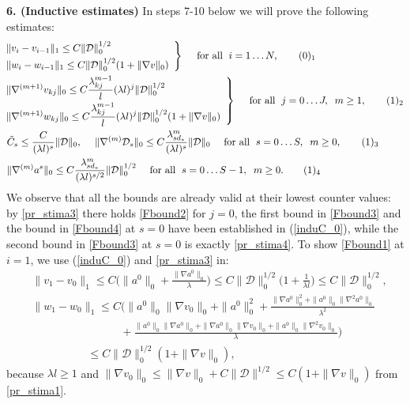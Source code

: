 \documentclass[reqno,twoside,11pt]{amsart}
\numberwithin{equation}{section}
\theoremstyle{plain}
\theoremstyle{definition}
\begin{document}
{\bf 6. (Inductive estimates)} In steps 7-10 below we will prove the following estimates:
\begin{align*}
& \hspace{-3mm} \left. \begin{array}{l} \|v_i - v_{i-1}\|_1\leq
    C\|\mathcal{D}\|_0^{1/2} \vspace{1mm} \\ \|w_i -
w_{i-1}\|_1\leq C\|\mathcal{D}\|_0^{1/2}(1+\|\nabla v\|_0) \end{array}\right\}\quad\mbox{
  for all }\; i=1\ldots N, \tag*{(\theequation)$_1$}\refstepcounter{equation} \label{Fbound1}\medskip\\
& \hspace{-3mm} \left. \begin{array}{l}
\displaystyle{ \|\nabla^{(m+1)}v_{kj}\|_0\leq C\frac{\lambda_{kj}^{m-1}}{l} (\lambda l)^j\|\mathcal{D}\|_0^{1/2} }
\vspace{1mm} \\  \displaystyle{\|\nabla^{(m+1)}w_{kj}\|_0\leq C\frac{\lambda_{kj}^{m-1}}{l} (\lambda
l)^j\|\mathcal{D}\|_0^{1/2} (1+\|\nabla v\|_0)}
\end{array}\right\} \quad\mbox{ for all }\; j=0\ldots J, \; \; m\geq
1, \tag*{(\theequation)$_2$}\label{Fbound2} \medskip\\
& \tilde C_s\leq \frac{C}{(\lambda l)^s}\|\mathcal{D}\|_0, \; \quad
\|\nabla^{(m)}\mathcal{D}_s\|_0\leq C\frac{\lambda_{sd_*}^m}{(\lambda
  l)^s}\|\mathcal{D}\|_0 \quad\mbox{ for all }\; s=0\ldots S, \;\;
m\geq 0, \tag*{(\theequation)$_3$}\label{Fbound3} \medskip\\
& \|\nabla^{(m)}a^s\|_0\leq C\frac{\lambda_{sd_*}^m}{(\lambda
  l)^{s/2}}\|\mathcal{D}\|_0^{1/2} \quad\mbox{ for all }\; s=0\ldots
S-1, \;\; m\geq 0. \tag*{(\theequation)$_4$}\label{Fbound4} 
\end{align*}
We observe that all the bounds are already valid at their lowest counter values:
by \ref{pr_stima3} there holds \ref{Fbound2} for $j=0$,
the first bound in \ref{Fbound3} and the bound in \ref{Fbound4} at
$s=0$ have been established in (\ref{induC_0}), while the second bound
in \ref{Fbound3} at $s=0$ is exactly \ref{pr_stima4}. To show
\ref{Fbound1} at $i=1$, we use (\ref{induC_0}) and \ref{pr_stima3} in:
\begin{equation*}
\begin{split}
& \|v_1-v_0\|_1\leq C\Big(\|a^0\|_0 +
\frac{\|\nabla a^0\|_0}{\lambda}\Big) \leq C\|\mathcal{D}\|^{1/2}_0
\big(1+\frac{1}{\lambda l}\big)\leq C\|\mathcal{D}\|^{1/2}_0,\\
& \|w_1-w_0\|_1\leq C\Big(\|a^0\|_0 \|\nabla v_0\|_0 + \|a^0\|_0^2 + 
\frac{\|\nabla a^0\|_0^2+ \|a^0\|_0 \|\nabla^2 a^0\|_0}{\lambda^2} \\
& \qquad\qquad \qquad\qquad + 
\frac{\|a^0\|_0 \|\nabla a^0\|_0 +\|\nabla a^0\|_0 \|\nabla v_0\|_0+\|a^0\|_0 \|\nabla^2 v_0\|_0}{\lambda} 
\Big) \\ & \qquad\qquad\quad \leq C\|\mathcal{D}\|_0^{1/2}(1+\|\nabla v\|_0 ),
\end{split}
\end{equation*}
because $\lambda l\geq 1$ and $\|\nabla v_0\|_0\leq \|\nabla v\|_0 +
C\|\mathcal{D}\|^{1/2}\leq C(1+ \|\nabla v\|_0 )$ from \ref{pr_stima1}.
\end{document}
